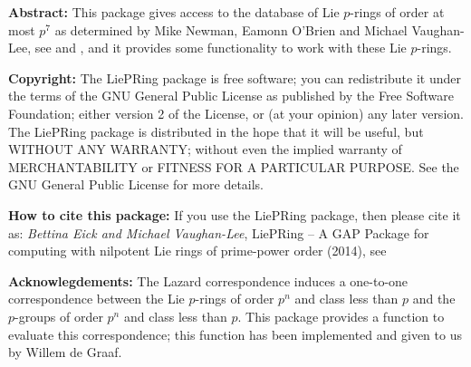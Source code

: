 

{\bf Abstract:}
This package gives access to the database of Lie $p$-rings of order at most 
$p^7$ as determined by Mike Newman, Eamonn O'Brien and Michael Vaughan-Lee, 
see \cite{NOV04} and \cite{OVL05}, and it provides some functionality to 
work with these Lie $p$-rings.
\bigskip

{\bf Copyright:}
The LiePRing package is free software; you can redistribute it under the 
terms of the GNU General Public License as published by the Free Software 
Foundation; either version 2 of the License, or (at your opinion) any 
later version. The LiePRing package is distributed in the hope that it will 
be useful, but WITHOUT ANY WARRANTY; without even the implied warranty of
MERCHANTABILITY or FITNESS FOR A PARTICULAR PURPOSE. See the GNU General 
Public License for more details.
\bigskip

{\bf How to cite this package:}
If you use the LiePRing package, then please cite it as:
{\it Bettina Eick and Michael Vaughan-Lee}, LiePRing -- A GAP Package for
computing with nilpotent Lie rings of prime-power order (2014), see
\bigskip

{\bf Acknowlegdements:}
The Lazard correspondence induces a one-to-one correspondence between the
Lie $p$-rings of order $p^n$ and class less than $p$ and the $p$-groups of 
order $p^n$ and class less than $p$. This package provides a function to 
evaluate this correspondence; this function has been implemented and given
to us by Willem de Graaf. 


